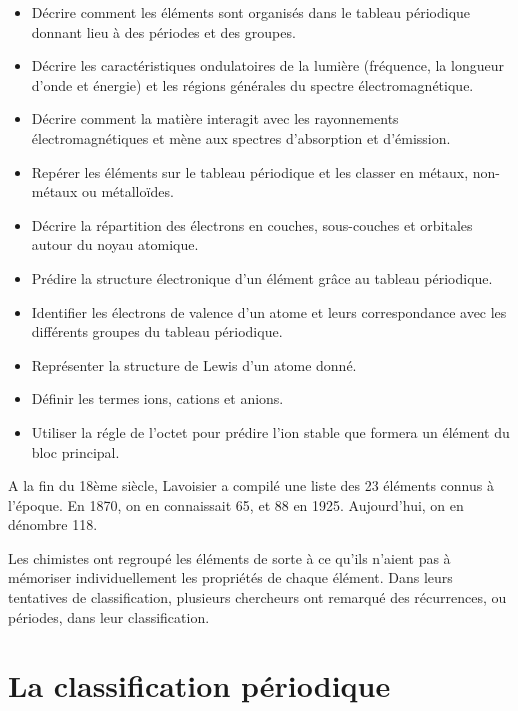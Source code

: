 \documentclass[
  11pt,
  french,
  a4paper,
  openany]{book}
\providecommand{\tightlist}{%
  \setlength{\itemsep}{0pt}\setlength{\parskip}{0pt}}
\begin{document}
\begin{objectives}

\begin{itemize}
\tightlist
\item
  Décrire comment les éléments sont organisés dans le tableau périodique donnant lieu à des périodes et des groupes.
\item
  Décrire les caractéristiques ondulatoires de la lumière (fréquence, la longueur d'onde et énergie) et les régions générales du spectre électromagnétique.
\item
  Décrire comment la matière interagit avec les rayonnements électromagnétiques et mène aux spectres d'absorption et d'émission.
\item
  Repérer les éléments sur le tableau périodique et les classer en métaux, non-métaux ou métalloïdes.
\item
  Décrire la répartition des électrons en couches, sous-couches et orbitales autour du noyau atomique.
\item
  Prédire la structure électronique d'un élément grâce au tableau périodique.
\item
  Identifier les électrons de valence d'un atome et leurs correspondance avec les différents groupes du tableau périodique.
\item
  Représenter la structure de Lewis d'un atome donné.
\item
  Définir les termes ions, cations et anions.
\item
  Utiliser la régle de l'octet pour prédire l'ion stable que formera un élément du bloc principal.
\end{itemize}


\end{objectives}

A la fin du 18ème siècle, Lavoisier a compilé une liste des 23 éléments connus à l'époque. En 1870, on en connaissait 65, et 88 en 1925. Aujourd'hui, on en dénombre 118.

Les chimistes ont regroupé les éléments de sorte à ce qu'ils n'aient pas à mémoriser individuellement les propriétés de chaque élément. Dans leurs tentatives de classification, plusieurs chercheurs ont remarqué des récurrences, ou périodes, dans leur classification.

\hypertarget{la-classification-puxe9riodique}{%
\section{La classification périodique}\label{la-classification-puxe9riodique}}
\end{document}
